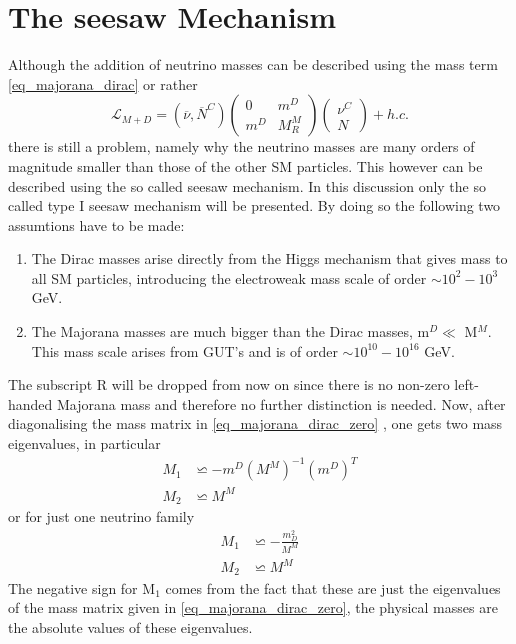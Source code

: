\section{The seesaw Mechanism}
Although the addition of neutrino masses can be described using the mass term \ref{eq_majorana_dirac} or rather
\begin{equation}
\mathcal{L}_{M+D}=\left(\overline{\nu},\overline{N}^C\right)	\left(\begin{array}{cc}0&m^D\\m^D&M^M_R\end{array}\right)	\left(\begin{array}{c}\nu^C\\N\end{array}\right)+h.c.
\label{eq_majorana_dirac_zero}
\end{equation}
there is still a problem, namely why the neutrino masses are many orders of magnitude smaller than those of the other SM particles. This however can be described using the so called seesaw mechanism. In this discussion only the so called type I seesaw mechanism will be presented. By doing so the following two assumtions have to be made:
\begin{enumerate}
	\item The Dirac masses arise directly from the Higgs mechanism that gives mass to all SM particles, introducing the electroweak mass scale of order $\sim10^2-10^3$ GeV.
	\item The Majorana masses are much bigger than the Dirac masses, m$^D\ll$ M$^M$. This mass scale arises from GUT's and is of order $\sim10^{10}-10^{16}$ GeV.
\end{enumerate}
The subscript R will be dropped from now on since there is no non-zero left-handed Majorana mass and therefore no further distinction is needed.\newline
Now, after diagonalising the mass matrix in \ref{eq_majorana_dirac_zero} \cite[pp. 2-3]{Lindner:2001hr}, one gets two mass eigenvalues, in particular
\begin{align*}
	M_1&\backsimeq-m^D{\left(M^M\right)}^{-1}{\left(m^D\right)}^{T}\\
	M_2&\backsimeq M^M
\end{align*}
or for just one neutrino family
\begin{align}
	M_1&\backsimeq -\frac{m_D^2}{M^M}
	\label{eq:light_neutrino}
	\\
	M_2&\backsimeq M^M
	\label{eq:heavy_neutrino}
\end{align}
The negative sign for M$_1$ comes from the fact that these are just the eigenvalues of the mass matrix given in \ref{eq_majorana_dirac_zero}, the physical masses are the absolute values of these eigenvalues. \newline
